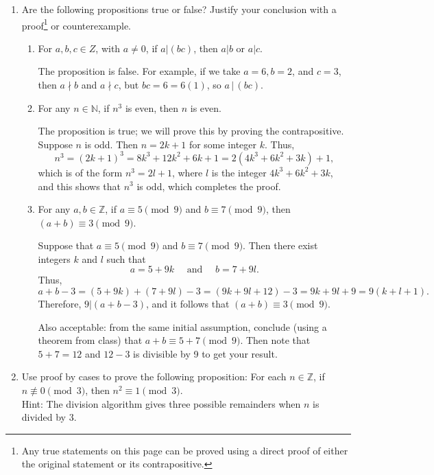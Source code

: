 \documentclass[12pt]{article}
\newcommand{\points}[1]{\marginpar{\hspace{24pt}[#1]}}
\newcommand{\N}{\mathbb{N}}
\newcommand{\Z}{\mathbb{Z}}
\begin{document}
\begin{enumerate}
\newpage

\item Are the following propositions true or false? Justify your conclusion with a proof\footnote{Any true statements on this page can be proved using a direct proof of either the original statement or its contrapositive.} or counterexample.
\begin{enumerate}
\item For $a,b,c\in Z$, with $a\neq 0$, if $a|(bc)$, then $a|b$ or $a|c$.\points{4}

\bigskip

The proposition is false. For example, if we take $a=6, b=2$, and $c=3$, then $a\nmid b$ and $a\nmid c$, but $bc=6=6(1)$, so $a\,|\,(bc)$.

\bigskip

\item For any $n\in \N$, if $n^3$ is even, then $n$ is even. \points{4}

\bigskip

The proposition is true; we will prove this by proving the contrapositive. Suppose $n$ is odd. Then $n=2k+1$ for some integer $k$. Thus,
\[
 n^3 = (2k+1)^3 = 8k^3+12k^2+6k+1 = 2(4k^3+6k^2+3k)+1,
\]
which is of the form $n^3=2l+1$, where $l$ is the integer $4k^3+6k^2+3k$, and this shows that $n^3$ is odd, which completes the proof.

\bigskip

\item  For any $a,b\in\Z$, if $a\equiv 5\pmod{9}$ and $b\equiv 7\pmod{9}$, then $(a+b)\equiv 3\pmod{9}$.\points{4}

\bigskip

Suppose that $a\equiv 5\pmod{9}$ and $b\equiv 7\pmod{9}$. Then there exist integers $k$ and $l$ such that
\[
 a = 5+9k \quad\text{ and }\quad b = 7+9l.
\]
Thus, 
\[
 a+b - 3 = (5+9k)+(7+9l) -3 = (9k+9l+12) - 3 =9k+9l+9 = 9(k+l+1).
\]
Therefore, $9|(a+b-3)$, and it follows that $(a+b)\equiv 3\pmod{9}$.

\bigskip

Also acceptable: from the same initial assumption, conclude (using a theorem from class) that $a+b\equiv 5+7 \pmod{9}$. Then note that $5+7=12$ and $12-3$ is divisible by 9 to get your result.
\end{enumerate}
\newpage

\item Use proof by cases to prove the following proposition: For each $n\in\Z$, if $n\not\equiv 0\pmod{3}$, then $n^2\equiv 1\pmod{3}$. \points{5}\\
Hint: The division algorithm gives three possible remainders when $n$ is divided by 3.


\end{enumerate}
\end{document}
